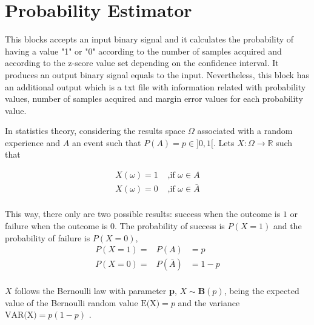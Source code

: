 \clearpage

\section{Probability Estimator}

\maketitle

This blocks accepts an input binary signal and it calculates the probability of having a value "1" \space or "0" \space according to the number of samples acquired and according to the z-score value set depending on the confidence interval. It produces an output binary signal equals to the input. Nevertheless, this block has an additional output which is a txt file with information related with probability values, number of samples acquired and margin error values for each probability value.

In statistics theory, considering the results space $\Omega$ associated with a random experience and $A$ an event such that $P(A)=p\in]0,1[$. Lets $X:\Omega\longrightarrow\mathbb{R}$ such that

\begin{eqnarray}
		X(\omega) = 1&\textrm{ ,if } \omega \in A \nonumber \\
		X(\omega) = 0&\textrm{ ,if } \omega \in \bar{A} \nonumber\\
\end{eqnarray}

This way, there only are two possible results: success when the outcome is $1$ or failure when the outcome is $0$. The probability of success is $P(X=1)$ and the probability of failure is $P(X=0)$,
\begin{eqnarray}
		P(X=1) =& P(A) & = p \nonumber\\
		P(X=0) =&P(\bar{A})&=1-p  \nonumber\\
\end{eqnarray}

$X$ follows the Bernoulli law with parameter \textbf{p}, $X \sim \mathbf{B}(p)$, being the expected value of the Bernoulli random value $\textrm{E(X)}=p$ and the variance $\textrm{VAR(X)}=p(1-p)$ \cite{probabilitySheldon}.

